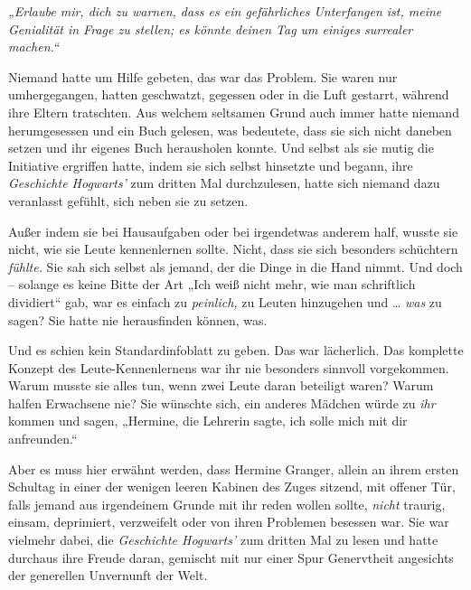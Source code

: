 

\hypertarget{positive-bias}{%

\emph{„Erlaube mir, dich zu warnen, dass es ein gefährliches Unterfangen ist, meine Genialität in Frage zu stellen; es könnte deinen Tag um einiges surrealer machen.“}

\later

Niemand hatte um Hilfe gebeten, das war das Problem. Sie waren nur umhergegangen, hatten geschwatzt, gegessen oder in die Luft gestarrt, während ihre Eltern tratschten. Aus welchem seltsamen Grund auch immer hatte niemand herumgesessen und ein Buch gelesen, was bedeutete, dass sie sich nicht daneben setzen und ihr eigenes Buch herausholen konnte. Und selbst als sie mutig die Initiative ergriffen hatte, indem sie sich selbst hinsetzte und begann, ihre \emph{Geschichte Hogwarts'} zum dritten Mal durchzulesen, hatte sich niemand dazu veranlasst gefühlt, sich neben sie zu setzen.

Außer indem sie bei Hausaufgaben oder bei irgendetwas anderem half, wusste sie nicht, wie sie Leute kennenlernen sollte. Nicht, dass sie sich besonders schüchtern \emph{fühlte.} Sie sah sich selbst als jemand, der die Dinge in die Hand nimmt. Und doch -- solange es keine Bitte der Art „Ich weiß nicht mehr, wie man schriftlich dividiert“ gab, war es einfach zu \emph{peinlich,} zu Leuten hinzugehen und … \emph{was} zu sagen? Sie hatte nie herausfinden können, was.

Und es schien kein Standardinfoblatt zu geben. Das war lächerlich. Das komplette Konzept des Leute-Kennenlernens war ihr nie besonders sinnvoll vorgekommen. Warum musste sie alles tun, wenn zwei Leute daran beteiligt waren? Warum halfen Erwachsene nie? Sie wünschte sich, ein anderes Mädchen würde zu \emph{ihr} kommen und sagen, „Hermine, die Lehrerin sagte, ich solle mich mit dir anfreunden.“

Aber es muss hier erwähnt werden, dass Hermine Granger, allein an ihrem ersten Schultag in einer der wenigen leeren Kabinen des Zuges sitzend, mit offener Tür, falls jemand aus irgendeinem Grunde mit ihr reden wollen sollte, \emph{nicht} traurig, einsam, deprimiert, verzweifelt oder von ihren Problemen besessen war. Sie war vielmehr dabei, die \emph{Geschichte Hogwarts'} zum dritten Mal zu lesen und hatte durchaus ihre Freude daran, gemischt mit nur einer Spur Genervtheit angesichts der generellen Unvernunft der Welt.

}

